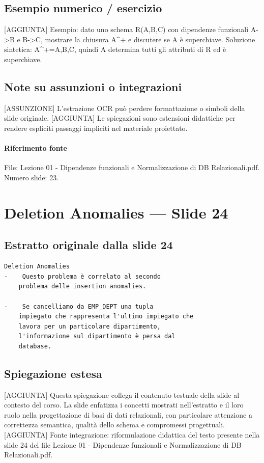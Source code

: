 \documentclass[11pt]{article}
\begin{document}
\subsection*{Esempio numerico / esercizio}
[AGGIUNTA] Esempio: dato uno schema R(A,B,C) con dipendenze funzionali A->B e B->C, mostrare la chiusura A^+ e discutere se A è superchiave. Soluzione sintetica: A^+={A,B,C}, quindi A determina tutti gli attributi di R ed è superchiave.
\subsection*{Note su assunzioni o integrazioni}
[ASSUNZIONE] L'estrazione OCR può perdere formattazione o simboli della slide originale.
[AGGIUNTA] Le spiegazioni sono estensioni didattiche per rendere espliciti passaggi impliciti nel materiale proiettato.
\paragraph{Riferimento fonte} File: Lezione 01 - Dipendenze funzionali e Normalizzazione di DB Relazionali.pdf. Numero slide: 23.
\section{Deletion Anomalies --- Slide 24}
\subsection*{Estratto originale dalla slide 24}
\begin{lstlisting}
Deletion Anomalies
-    Questo problema è correlato al secondo
    problema delle insertion anomalies.

-    Se cancelliamo da EMP_DEPT una tupla
    impiegato che rappresenta l'ultimo impiegato che
    lavora per un particolare dipartimento,
    l'informazione sul dipartimento è persa dal
    database.
\end{lstlisting}
\subsection*{Spiegazione estesa}
[AGGIUNTA] Questa spiegazione collega il contenuto testuale della slide al contesto del corso. La slide enfatizza i concetti mostrati nell'estratto e il loro ruolo nella progettazione di basi di dati relazionali, con particolare attenzione a correttezza semantica, qualità dello schema e compromessi progettuali.
[AGGIUNTA] Fonte integrazione: riformulazione didattica del testo presente nella slide 24 del file Lezione 01 - Dipendenze funzionali e Normalizzazione di DB Relazionali.pdf.
\end{document}
